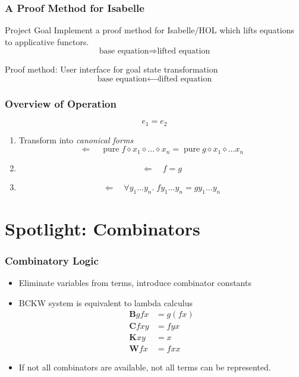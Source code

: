 \documentclass{beamer}
\DeclareMathOperator{\pure}{pure}
\newcommand{\ap}{\diamond}
\begin{document}
\begin{frame}
\frametitle{A Proof Method for Isabelle}

\begin{block}{Project Goal}
Implement a proof method for Isabelle/HOL which lifts equations to
applicative functors.
\[ \text{base equation} \Longrightarrow \text{lifted equation} \]
\end{block}

\vspace{5mm}
Proof method: User interface for goal state transformation
\[ \text{base equation} \longmapsfrom \text{lifted equation} \]
\end{frame}

\begin{frame}
\frametitle{Overview of Operation}

\[ e_1 = e_2 \]
\begin{enumerate}
\item Transform into \emph{canonical forms}
\[ \Longleftarrow\quad \pure f \ap x_1 \ap \dots \ap x_n = \pure g \ap x_1 \ap \dots x_n \]
\item \[ \Longleftarrow\quad f = g \]
\item \[ \Longleftarrow\quad \forall y_1 \dots y_n. \; f y_1 \dots y_n = g y_1 \dots y_n \]
\end{enumerate}
\end{frame}


\section{Spotlight: Combinators} %

\begin{frame}
\frametitle{Combinatory Logic}

\begin{itemize}
\item Eliminate variables from terms, introduce combinator constants
\item BCKW system is equivalent to lambda calculus
\begin{align*}
\mathbf{B} g f x &= g (f x) \\
\mathbf{C} f x y &= f y x \\
\mathbf{K} x y &= x \\
\mathbf{W} f x &= f x x
\end{align*}
\item If not all combinators are available, not all terms can be represented.
\end{itemize}
\end{frame}
\end{document}
